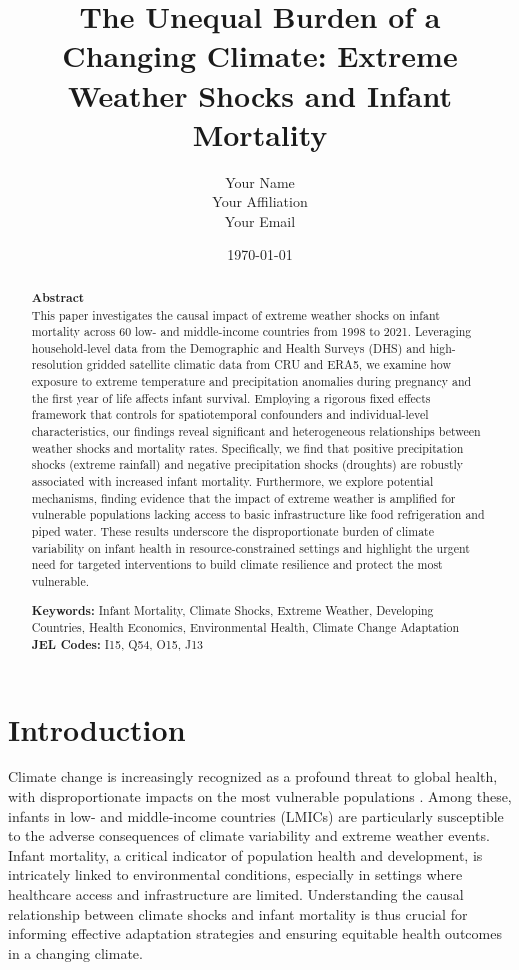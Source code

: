 \documentclass[12pt]{article}
\title{The Unequal Burden of a Changing Climate: Extreme Weather Shocks and Infant Mortality} %
\author{Your Name \\ %
Your Affiliation \\
Your Email}
\date{\today}
\begin{document}
\maketitle

\begin{abstract}
\noindent \textbf{Abstract} \\ %
This paper investigates the causal impact of extreme weather shocks on infant mortality across 60 low- and middle-income countries from 1998 to 2021. Leveraging household-level data from the Demographic and Health Surveys (DHS) and high-resolution gridded satellite climatic data from CRU and ERA5, we examine how exposure to extreme temperature and precipitation anomalies during pregnancy and the first year of life affects infant survival.  Employing a rigorous fixed effects framework that controls for spatiotemporal confounders and individual-level characteristics, our findings reveal significant and heterogeneous relationships between weather shocks and mortality rates.  Specifically, we find that positive precipitation shocks (extreme rainfall) and negative precipitation shocks (droughts) are robustly associated with increased infant mortality.  Furthermore, we explore potential mechanisms, finding evidence that the impact of extreme weather is amplified for vulnerable populations lacking access to basic infrastructure like food refrigeration and piped water.  These results underscore the disproportionate burden of climate variability on infant health in resource-constrained settings and highlight the urgent need for targeted interventions to build climate resilience and protect the most vulnerable.

\bigskip
\noindent \textbf{Keywords:} Infant Mortality, Climate Shocks, Extreme Weather, Developing Countries, Health Economics, Environmental Health, Climate Change Adaptation \\ %
\noindent \textbf{JEL Codes:} I15, Q54, O15, J13 %
\end{abstract}

\newpage

\section{Introduction}

Climate change is increasingly recognized as a profound threat to global health, with disproportionate impacts on the most vulnerable populations \cite{watts2018}. Among these, infants in low- and middle-income countries (LMICs) are particularly susceptible to the adverse consequences of climate variability and extreme weather events.  Infant mortality, a critical indicator of population health and development, is intricately linked to environmental conditions, especially in settings where healthcare access and infrastructure are limited. Understanding the causal relationship between climate shocks and infant mortality is thus crucial for informing effective adaptation strategies and ensuring equitable health outcomes in a changing climate.
\end{document}

